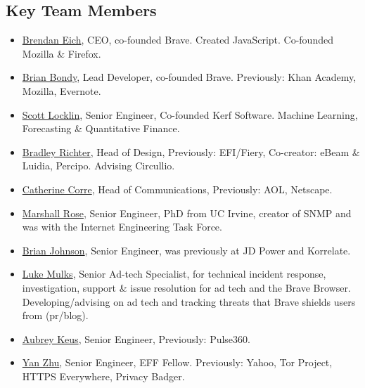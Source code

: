 \documentclass[11pt]{article}
\begin{document}
\subsection{Key Team Members}
\label{sec-5-4}
\begin{itemize}
\item{\href{https://www.linkedin.com/in/brendaneich}{Brendan Eich}, CEO, co-founded Brave. Created JavaScript. Co-founded Mozilla \& Firefox.}
\item{\href{https://www.linkedin.com/in/bbondy/}{Brian Bondy}, Lead Developer, co-founded Brave. Previously: Khan Academy, Mozilla, Evernote.}
\item{\href{https://www.linkedin.com/in/scottlocklin/}{Scott Locklin}, Senior Engineer, Co-founded Kerf Software. Machine Learning, Forecasting \& Quantitative Finance.}
\item{\href{https://www.linkedin.com/in/richterbrad/}{Bradley Richter}, Head of Design, Previously: EFI/Fiery, Co-creator: eBeam \& Luidia, Percipo. Advising Circullio.}
\item{\href{https://www.linkedin.com/in/catherine-corre-b2817/}{Catherine Corre}, Head of Communications, Previously: AOL, Netscape.}
\item{\href{https://www.linkedin.com/in/marshallrose}{Marshall Rose}, Senior Engineer, PhD from UC Irvine, creator of SNMP and was with the Internet Engineering Task Force.}
\item{\href{https://www.linkedin.com/in/brian-johnson-aaa11018/}{Brian Johnson}, Senior Engineer, was previously at JD Power and Korrelate.}
\item{\href{https://www.linkedin.com/in/pureproductions/}{Luke Mulks}, Senior Ad-tech Specialist, for technical incident response, investigation, support \& issue resolution for ad tech and the Brave Browser. Developing/advising on ad tech and tracking threats that Brave shields users from (pr/blog).}
\item{\href{https://www.linkedin.com/in/aubrey-keus-13b887/}{Aubrey Keus}, Senior Engineer, Previously: Pulse360.}
\item{\href{https://www.linkedin.com/in/yan-zhu-b7124227/}{Yan Zhu}, Senior Engineer, EFF Fellow. Previously: Yahoo, Tor Project, HTTPS Everywhere, Privacy Badger.}
\end{itemize}

\pagebreak
\end{document}
